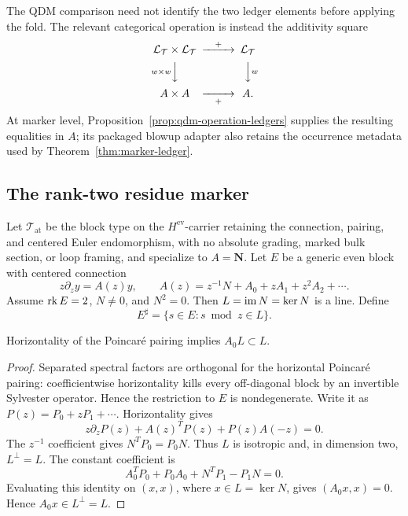 The QDM comparison need not identify the two ledger elements before applying
the fold.  The relevant categorical operation is instead the additivity square
\begin{equation}
\begin{CD}
 \mathcal L_{\mathcal T}\times\mathcal L_{\mathcal T}
 @>{+}>> \mathcal L_{\mathcal T}\\
 @V{w\times w}VV @VV{w}V\\
 A\times A @>>{+}> A.
\end{CD}
\label{diag:marker-fold-additivity}
\end{equation}
At marker level, Proposition~\ref{prop:qdm-operation-ledgers} supplies the
resulting equalities in \(A\); its packaged blowup adapter also retains the
occurrence metadata used by Theorem~\ref{thm:marker-ledger}.

\subsection{The rank-two residue marker}

Let \(\mathcal T_{\mathrm{at}}\) be the block type on the
\(H^{\mathrm{ev}}\)-carrier retaining the connection, pairing, and centered
Euler endomorphism, with no absolute grading, marked bulk section, or loop
framing, and specialize to \(A=\mathbf N\).  Let \(E\) be a generic even block
with centered connection
\begin{equation}
 z\partial_z y=A(z)y,
 \qquad A(z)=z^{-1}N+A_0+zA_1+z^2A_2+\cdots.
 \label{eq:atomic-block-expansion}
\end{equation}
Assume \(\operatorname{rk} E=2\), \(N\ne0\), and \(N^2=0\).  Then
\(L=\operatorname{im} N=\ker N\) is a line.  Define
\begin{equation}
 E^\sharp=\{s\in E:s\bmod z\in L\}.
 \label{eq:atomic-modification}
\end{equation}

\begin{lemma}
\label{lem:A0preserve}
%
%
Horizontality of the Poincar\'e pairing implies \(A_0L\subset L\).
\end{lemma}

\begin{proof}
Separated spectral factors are orthogonal for the horizontal Poincar\'e
pairing: coefficientwise horizontality kills every off-diagonal block by an
invertible Sylvester operator.  Hence the restriction to \(E\) is
nondegenerate.  Write it as \(P(z)=P_0+zP_1+\cdots\).  Horizontality gives
\[
 z\partial_zP(z)+A(z)^TP(z)+P(z)A(-z)=0.
\]
The \(z^{-1}\) coefficient gives \(N^TP_0=P_0N\).  Thus \(L\) is isotropic
and, in dimension two, \(L^\perp=L\).  The constant coefficient is
\[
 A_0^TP_0+P_0A_0+N^TP_1-P_1N=0.
\]
Evaluating this identity on \((x,x)\), where \(x\in L=\ker N\), gives
\((A_0x,x)=0\).  Hence \(A_0x\in L^\perp=L\).
\end{proof}

